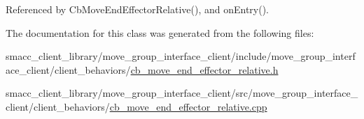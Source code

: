 Referenced by Cb\+Move\+End\+Effector\+Relative(), and on\+Entry().



The documentation for this class was generated from the following files\+:\begin{DoxyCompactItemize}
\item 
smacc\+\_\+client\+\_\+library/move\+\_\+group\+\_\+interface\+\_\+client/include/move\+\_\+group\+\_\+interface\+\_\+client/client\+\_\+behaviors/\hyperlink{cb__move__end__effector__relative_8h}{cb\+\_\+move\+\_\+end\+\_\+effector\+\_\+relative.\+h}\item 
smacc\+\_\+client\+\_\+library/move\+\_\+group\+\_\+interface\+\_\+client/src/move\+\_\+group\+\_\+interface\+\_\+client/client\+\_\+behaviors/\hyperlink{cb__move__end__effector__relative_8cpp}{cb\+\_\+move\+\_\+end\+\_\+effector\+\_\+relative.\+cpp}\end{DoxyCompactItemize}
